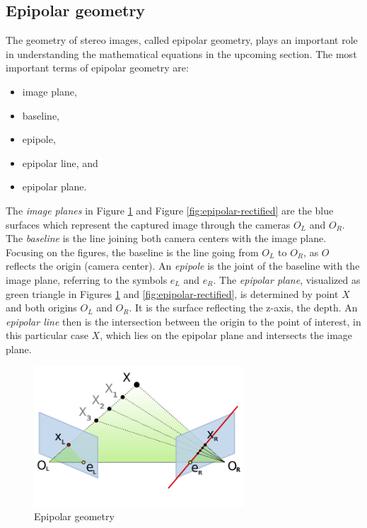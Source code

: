\subsection*{Epipolar geometry}

The geometry of stereo images, called epipolar geometry, plays an important role in understanding the mathematical equations in the upcoming section.
The most important terms of epipolar geometry are:

\begin{itemize}
  \item image plane,
  \item baseline,
  \item epipole,
  \item epipolar line, and
  \item epipolar plane.
\end{itemize}

\noindent The \textit{image planes} in Figure \ref{fig:epipolar} and Figure \ref{fig:epipolar-rectified} are the blue surfaces which represent the captured image through the cameras $O_L$ and $O_R$.
The \textit{baseline} is the line joining both camera centers with the image plane. Focusing on the figures, the baseline is the line going from $O_L$ to $O_R$, as $O$ reflects the origin (camera center).
An \textit{epipole} is the joint of the baseline with the image plane, referring to the symbols $e_L$ and $e_R$.
The \textit{epipolar plane}, visualized as green triangle in Figures \ref{fig:epipolar} and \ref{fig:epipolar-rectified}, is determined by point $X$ and both origins $O_L$ and $O_R$.
It is the surface reflecting the z-axis, the depth.
An \textit{epipolar line} then is the intersection between the origin to the point of interest, in this particular case $X$, which lies on the epipolar plane and intersects the image plane.

\begin{figure}[h!]
  \centering
  \includegraphics[width=0.7\textwidth]{src/images/epipolar.png}
  \caption[Epipolar geometry]{Epipolar geometry\protect\footnotemark}
  \label{fig:epipolar}
\end{figure}

